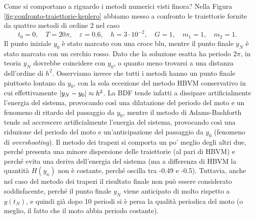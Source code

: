 Come si comportano a riguardo i metodi numerici visti finora?
Nella Figura \ref{fig:confronto-traiettorie-keplero} abbiamo messo a confronto
le traiettorie fornite da quattro metodi di ordine 2 nel caso
\[
t_0 = 0, \quad
T = 20\pi, \quad
\varepsilon = 0.6, \quad
h = 3 \cdot 10^{-2}, \quad
G = 1, \quad
m_1 = 1, \quad
m_2 = 1.
\]
Il punto iniziale $y_0$ è stato marcato con una croce blu, mentre il punto
finale $y_N$ è stato marcato con un cerchio rosso. Dato che la soluzione esatta
ha periodo $2\pi$, in teoria $y_N$ dovrebbe coincidere con $y_0$,
o quanto meno trovarsi a una distanza dell'ordine di $h^2$.
Osserviamo invece che tutti i metodi hanno un punto finale piuttosto lontano
da $y_0$, con la sola eccezione del metodo HBVM conservativo in cui
effettivamente $\left\lvert y_N-y_0\right\rvert \approx h^2$.
La BDF tende infatti a dissipare artificialmente l'energia del sistema,
provocando così una dilatazione del periodo del moto e un fenomeno di ritardo
del passaggio da $y_0$, mentre il metodo di Adams-Bashforth tende ad accrescere
artificialmente l'energia del sistema, provocando così una riduzione del periodo
del moto e un'anticipazione del passaggio da $y_0$ (fenomeno di \emph{overshooting}).
Il metodo dei trapezi si comporta un po' meglio degli altri due, perché
presenta una minore dispersione delle traiettorie (al pari di HBVM)
e perché evita una deriva dell'energia del sistema (ma a differenza di HBVM
la quantità $H(y_n)$ non è costante, perché oscilla tra -0.49 e -0.5).
Tuttavia, anche nel caso del metodo dei trapezi il risultato finale non
può essere considerato soddisfacente, perché il punto finale $y_N$
viene anticipato di molto rispetto a $y(t_N)$, e quindi già dopo 10 periodi si è persa
la qualità periodica del moto (o meglio, il fatto che il moto abbia periodo costante).

